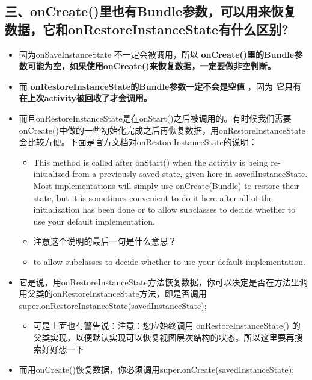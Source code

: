 \documentclass[9pt, b5paper]{article}
\begin{document}
\subsection{三、onCreate()里也有Bundle参数，可以用来恢复数据，它和onRestoreInstanceState有什么区别?}
\label{sec-11-3}
\begin{itemize}
\item 因为onSaveInstanceState 不一定会被调用，所以 \textbf{onCreate()里的Bundle参数可能为空，如果使用onCreate()来恢复数据，一定要做非空判断。}
\item 而 \textbf{onRestoreInstanceState的Bundle参数一定不会是空值} ，因为 \textbf{它只有在上次activity被回收了才会调用。}
\item 而且onRestoreInstanceState是在onStart()之后被调用的。有时候我们需要onCreate()中做的一些初始化完成之后再恢复数据，用onRestoreInstanceState会比较方便。下面是官方文档对onRestoreInstanceState的说明：
\begin{itemize}
\item This method is called after onStart() when the activity is being re-initialized from a previously saved state, given here in savedInstanceState. Most implementations will simply use onCreate(Bundle) to restore their state, but it is sometimes convenient to do it here after all of the initialization has been done or to allow subclasses to decide whether to use your default implementation.
\item 注意这个说明的最后一句是什么意思？
\item to allow subclasses to decide whether to use your default implementation.
\end{itemize}
\item 它是说，用onRestoreInstanceState方法恢复数据，你可以决定是否在方法里调用父类的onRestoreInstanceState方法，即是否调用super.onRestoreInstanceState(savedInstanceState); 
\begin{itemize}
\item 可是上面也有警告说：注意：您应始终调用 onRestoreInstanceState() 的父类实现，以便默认实现可以恢复视图层次结构的状态。所以这里要再搜索好好想一下
\end{itemize}
\item 而用onCreate()恢复数据，你必须调用super.onCreate(savedInstanceState);
\end{itemize}
\end{document}
